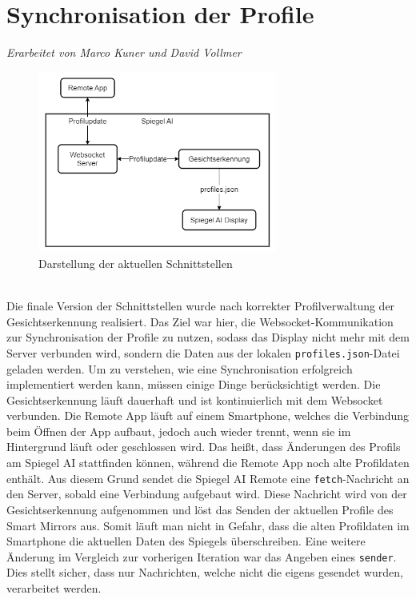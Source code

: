 \section{Synchronisation der Profile}
\textit{Erarbeitet von Marco Kuner und David Vollmer} \\
\begin{figure}[h]
    \centering
    \includegraphics[width=0.7\textwidth]{pictures/websocket_diagram.png}
    \captionsetup{justification=centering, labelformat=simple, singlelinecheck=false}
    \caption{Darstellung der aktuellen Schnittstellen}
    \label{fig:websocket_diagram}
\end{figure} \\
Die finale Version der Schnittstellen wurde nach korrekter Profilverwaltung der Gesichtserkennung realisiert. Das Ziel war hier, die Websocket-Kommunikation zur Synchronisation der Profile zu nutzen, sodass das Display nicht mehr mit dem Server verbunden wird, sondern die Daten aus der lokalen \texttt{profiles.json}-Datei geladen werden. Um zu verstehen, wie eine Synchronisation erfolgreich implementiert werden kann, müssen einige Dinge berücksichtigt werden. Die Gesichtserkennung läuft dauerhaft und ist kontinuierlich mit dem Websocket verbunden. Die Remote App läuft auf einem Smartphone, welches die Verbindung beim Öffnen der App aufbaut, jedoch auch wieder trennt, wenn sie im Hintergrund läuft oder geschlossen wird. Das heißt, dass Änderungen des Profils am Spiegel AI stattfinden können, während die Remote App noch alte Profildaten enthält. Aus diesem Grund sendet die Spiegel AI Remote eine \texttt{fetch}-Nachricht an den Server, sobald eine Verbindung aufgebaut wird. Diese Nachricht wird von der Gesichtserkennung aufgenommen und löst das Senden der aktuellen Profile des Smart Mirrors aus. Somit läuft man nicht in Gefahr, dass die alten Profildaten im Smartphone die aktuellen Daten des Spiegels überschreiben. Eine weitere Änderung im Vergleich zur vorherigen Iteration war das Angeben eines \texttt{sender}. Dies stellt sicher, dass nur Nachrichten, welche nicht die eigens gesendet wurden, verarbeitet werden.

